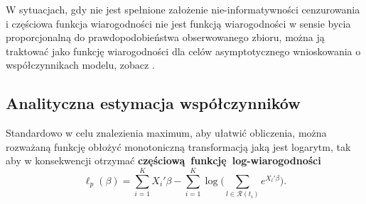 W sytuacjach, gdy nie jest spełnione założenie nie-informatywności cenzurowania i częściowa funkcja wiarogodności nie jest funkcją wiarogodności w sensie bycia proporcjonalną do prawdopodobieństwa obserwowanego zbioru, można ją traktować jako funkcję wiarogodności dla celów asymptotycznego wnioskowania o współczynnikach modelu, zobacz \cite{???}.


\subsection{Analityczna estymacja współczynników}
Standardowo w celu znalezienia maximum, aby ułatwić obliczenia, można rozważaną funkcję obłożyć monotoniczną transformacją jaką jest logarytm, tak aby w konsekwencji otrzymać \textbf{częściową~funkcję~log-wiarogodności}
\begin{equation}
\ell_p(\beta) = \sum\limits_{i=1}^{K}X_i'\beta - \sum\limits_{i=1}^{K}\log\Big(\sum\limits_{l\in \mathscr{R}(t_i)}^{}e^{X_l'\beta}\Big).
\end{equation}



